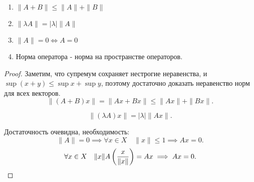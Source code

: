 \begin{properties} \thmslashn

    \begin{enumerate}
        \item $\|A + B\| \le \|A\| + \|B\|$ 
        \item $\|\lambda A\| = |\lambda| \|A\|$ 
        \item $\|A\| = 0 \iff A = 0$
        \item Норма оператора - норма на пространстве операторов.
    \end{enumerate}
    \begin{proof} \thmslashn

        Заметим, что супремум сохраняет нестрогие неравенства, и $\sup (x + y) \le \sup x + \sup y$, поэтому достаточно доказать неравенство норм для всех векторов.
        \[ \|(A+B)x\| = \|Ax + Bx\| \le \|Ax\| + \|Bx\|.\]

        \[ \|(\lambda A)x\| = |\lambda| \|Ax\| .\]

        Достаточность очевидна, необходимость: 
        \[ \|A\| = 0 \implies \forall{x\in X}\quad \|x\| \le 1 \implies Ax = 0  .\]
        \[ \forall{x\in X}\quad \|x\| A\left( \frac{x}{\|x\|} \right) = Ax \implies Ax = 0.\qedhere\] 
    \end{proof}
\end{properties}
